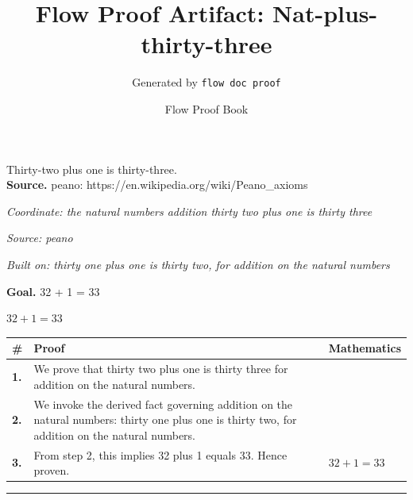 \documentclass[11pt]{article}
\title{Flow Proof Artifact: Nat-plus-thirty-three}
\author{Generated by \texttt{flow doc proof}}
\date{Flow Proof Book}
\theoremstyle{definition}
\begin{document}
\maketitle
Thirty-two plus one is thirty-three.\\[0.5em]
\textbf{Source.} peano: https://en.wikipedia.org/wiki/Peano\_axioms\\[0.5em]
\bigskip
{}\par
\smallskip\noindent\textit{Coordinate: the natural numbers \cdot addition \cdot thirty two plus one is thirty three}\par
\smallskip\noindent\textit{Source: peano}\par
\smallskip\noindent\textit{Built on: thirty one plus one is thirty two, for addition on the natural numbers}\par
\medskip
\noindent\textbf{Goal.} 32 + 1 = 33\par
\noindent$\displaystyle 32 + 1 = 33$\par
\medskip
\noindent
\begin{tabular}{@{} >{\raggedright\arraybackslash}p{} >{\raggedright\arraybackslash}p{} >{\raggedleft\arraybackslash}p{} @{}}
\textbf{\#} & \textbf{Proof} & \textbf{Mathematics} \\
\midrule
\textbf{1.} & We prove that thirty two plus one is thirty three for addition on the natural numbers. & \\[0.45em]
\textbf{2.} & We invoke the derived fact governing addition on the natural numbers: thirty one plus one is thirty two, for addition on the natural numbers. & \\[0.45em]
\textbf{3.} & From step 2, this implies 32 plus 1 equals 33. Hence proven. & $\displaystyle 32 + 1 = 33$ \\[0.45em]
\bottomrule
\end{tabular}
\label{thm:Nat-addition-thirty_two_plus_one_is_thirty_three}
\par\medskip\hrule
\end{document}
